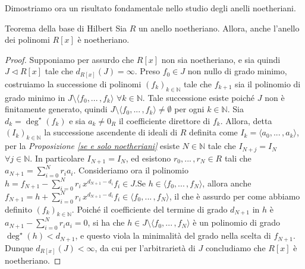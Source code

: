 \noindent Dimostriamo ora un risultato fondamentale nello studio degli anelli noetheriani.

\begin{teo}{Teorema della base di Hilbert}
  Sia $R$ un anello noetheriano. Allora, anche l'anello dei polinomi $R[x]$ è noetheriano.
\end{teo}
\vspace{-4mm}
\begin{proof}
  Supponiamo per assurdo che $R[x]$ non sia noetheriano, e sia quindi $J\lhd R[x]$ tale che $d_{R[x]}(J)=\infty.$ 
  Preso $f_0\in J$ non nullo di grado minimo, costruiamo la successione di polinomi $(f_k)_{k\in \mathbb{N}}$ tale che $f_{k+1}$ 
  sia il polinomio di grado minimo in $J\setminus \langle f_0, ...\,,f_k \rangle$ $\forall k\in \mathbb{N}.$ 
  Tale successione esiste poiché $J$ non è finitamente generato, quindi $J\setminus \langle f_0, ...\,,f_k \rangle\neq \emptyset$ 
  per ogni $k\in \mathbb{N}.$ Sia $d_k=\deg^{\star}(f_k)$ e sia $a_k\neq 0_R$ il coefficiente direttore di $f_k.$ 
  Allora, detta $(I_k)_{k\in \mathbb{N}}$ la successione ascendente di ideali di $R$ definita come $I_k=\langle a_0, ...\,,a_k\rangle$, 
  per la \emph{Proposizione \ref{se e solo noetheriani}} esiste $N\in \mathbb{N}$ tale che $I_{N+j}=I_{N}$ $\forall j\in \mathbb{N}.$ 
  In particolare $I_{N+1}=I_N$, ed esistono $r_0,...\,,r_N\in R$ tali che $a_{N+1}=\sum\limits_{i=0}^N r_ia_i.$ 
  Consideriamo ora il polinomio $h=f_{N+1}-\sum\limits_{i=0}^{N}r_i\, x^{d_{N+1}-d_i} f_i \in J.$\footnotemark\newline Se 
  $h\in \langle f_0,...\,,f_N\rangle$, allora anche $f_{N+1}=h+\sum\limits_{i=0}^{N}r_i\, x^{d_{N+1}-d_i} f_i\in \langle f_0,...\,,f_N\rangle$, 
  il che è assurdo per come abbiamo definito $(f_k)_{k\in \mathbb{N}}$. Poiché il coefficiente del termine di grado 
  $d_{N+1}$ in $h$ è $a_{N+1}-\sum\limits_{i=0}^N r_ia_i=0$, si ha che $h\in J\setminus \langle f_0,...\,,f_N\rangle$ è un polinomio di grado 
  $\deg^{\star}(h)<d_{N+1}$, e questo viola la minimalità del grado nella scelta di $f_{N+1}$. Dunque $d_{R[x]}(J)<\infty$, 
  da cui per l'arbitrarietà di $J$ concludiamo che $R[x]$ è noetheriano.
\end{proof}


